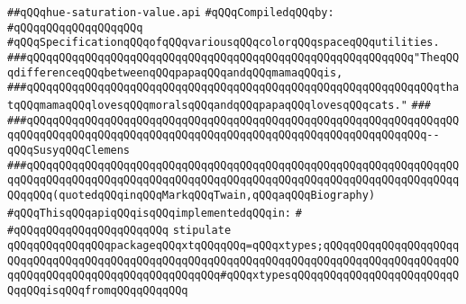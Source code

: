 \label{src/lib/x-kit/xclient/src/color/hue-saturation-value.api}
\verb|##qQQqhue-saturation-value.api|\newline
\newline
\verb|#qQQqCompiledqQQqby:|\newline
\verb|#qQQqqQQqqQQqqQQqqQQq|\newline
\newline
\newline
\newline
\verb|#qQQqSpecificationqQQqofqQQqvariousqQQqcolorqQQqspaceqQQqutilities.|\newline
\newline
\newline
\newline
\verb|###qQQqqQQqqQQqqQQqqQQqqQQqqQQqqQQqqQQqqQQqqQQqqQQqqQQqqQQqqQQq"TheqQQqdifferenceqQQqbetweenqQQqpapaqQQqandqQQqmamaqQQqis,|\newline
\verb|###qQQqqQQqqQQqqQQqqQQqqQQqqQQqqQQqqQQqqQQqqQQqqQQqqQQqqQQqqQQqqQQqthatqQQqmamaqQQqlovesqQQqmoralsqQQqandqQQqpapaqQQqlovesqQQqcats."|\newline
\verb|###|\newline
\verb|###qQQqqQQqqQQqqQQqqQQqqQQqqQQqqQQqqQQqqQQqqQQqqQQqqQQqqQQqqQQqqQQqqQQqqQQqqQQqqQQqqQQqqQQqqQQqqQQqqQQqqQQqqQQqqQQqqQQqqQQqqQQqqQQqqQQq--qQQqSusyqQQqClemens|\newline
\verb|###qQQqqQQqqQQqqQQqqQQqqQQqqQQqqQQqqQQqqQQqqQQqqQQqqQQqqQQqqQQqqQQqqQQqqQQqqQQqqQQqqQQqqQQqqQQqqQQqqQQqqQQqqQQqqQQqqQQqqQQqqQQqqQQqqQQqqQQqqQQqqQQq(quotedqQQqinqQQqMarkqQQqTwain,qQQqaqQQqBiography)|\newline
\newline
\newline
\verb|#qQQqThisqQQqapiqQQqisqQQqimplementedqQQqin:|\newline
\verb|#|\newline
\verb|#qQQqqQQqqQQqqQQqqQQq|\verb|qQQq|\newline
\newline
\verb|stipulate|\newline
\verb|qQQqqQQqqQQqqQQqpackageqQQqxtqQQqqQQq=qQQqxtypes;qQQqqQQqqQQqqQQqqQQqqQQqqQQqqQQqqQQqqQQqqQQqqQQqqQQqqQQqqQQqqQQqqQQqqQQqqQQqqQQqqQQqqQQqqQQqqQQqqQQqqQQqqQQqqQQqqQQqqQQqqQQq#qQQqxtypesqQQqqQQqqQQqqQQqqQQqqQQqqQQqqQQqisqQQqfromqQQqqQQqqQQq|\newline
